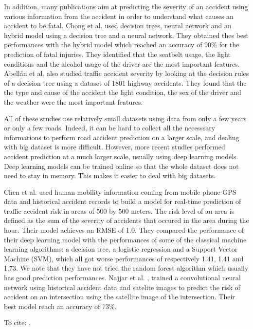 \documentclass[conference]{IEEEtran}
\begin{document}
  In addition, many publications aim at predicting the severity of an accident using various information from the accident in order to understand what causes an accident to be fatal. Chong et al. \cite{Chong2005} used decision trees, neural network and an hybrid model using a decision tree and a neural network. They obtained thes best performances with the hybrid model which reached an accuracy of 90\% for the prediction of fatal injuries. They identified that the seatbelt usage, the light conditions and the alcohol usage of the driver are the most important features. Abellán et al. \cite{Abellan2013} also studied traffic accident severity by looking at the decision rules of a decision tree using a dataset of 1801 highway accidents. They found that the the type and cause of the accident the light condition, the sex of the driver and the weather were the most important features.

All of these studies use relatively small datasets using data from only a few years or only a few roads. Indeed, it can be hard to collect all the necesssary informations to perform road accident prediction on a larger scale, and dealing with big dataset is more difficult. However, more recent studies performed accident prediction at a much larger scale, usually using deep learning models. Deep learning models can be trained online so that the whole dataset does not need to stay in memory. This makes it easier to deal with big datasets.

Chen et al. \cite{QChen2016} used human mobility information coming from mobile phone GPS data and historical accident records to build a model for real-time prediction of traffic accident risk in areas of 500 by 500 meters. The risk level of an area is defined as the sum of the severity of accidents that occured in the area during the hour. Their model achieves an RMSE of 1.0. They compared the performance of their deep learning model with the performances of some of the classical machine learning algorithms: a decision tree, a logistic regression and a Support Vector Machine (SVM), which all got worse performances of respectively 1.41, 1.41 and 1.73. We note that they have not tried the random forest algorithm which usually has good prediction performances. Najjar et al. \cite{Najjar2017}, trained a convolutional neural network using historical accident data and satelite images to predict the risk of accident on an intersection using the satellite image of the intersection. Their best model reach an accuracy of 73\%.

To cite: \cite{Ren2017, Yuan2018}.
\end{document}
